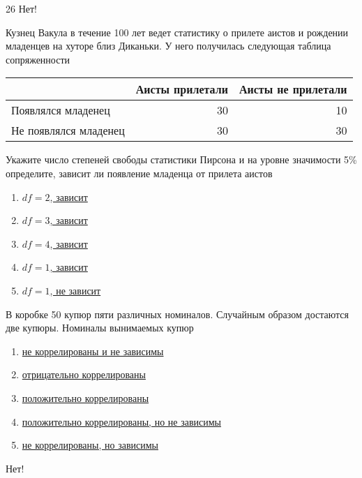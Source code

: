\documentclass[t]{beamer}
\begin{document}
 \begin{frame} \label{26-No} 
\begin{block}{26 \alert{Нет!} } 

   Кузнец Вакула в течение 100 лет ведет статистику о прилете аистов и рождении младенцев на хуторе близ Диканьки. У него получилась следующая таблица сопряженности

\begin{center}
\begin{tabular}{lrr} \toprule
& Аисты прилетали  & Аисты не прилетали \\
\midrule
Появлялся младенец & 30 & 10 \\
Не появлялся младенец & 30 & 30 \\
\bottomrule
\end{tabular}
\end{center}

Укажите число степеней свободы статистики Пирсона и на уровне значимости 5\% определите, зависит ли появление младенца от прилета аистов

  


 \end{block} 
\begin{enumerate} 
\item[] \hyperlink{26-No}{\beamergotobutton{} $df=2$, зависит}
\item[] \hyperlink{26-No}{\beamergotobutton{} $df=3$, зависит}
\item[] \hyperlink{26-No}{\beamergotobutton{} $df=4$, зависит}
\item[] \hyperlink{26-Yes}{\beamergotobutton{} $df=1$, зависит}
\item[] \hyperlink{26-No}{\beamergotobutton{} $df=1$, не зависит}
\end{enumerate} 

\end{frame} 


 \begin{frame} \label{27-No} 
\begin{block}{27} 

  В коробке 50 купюр пяти различных номиналов. Случайным образом достаются две купюры. Номиналы вынимаемых купюр
  


 \end{block} 
\begin{enumerate} 
\item[] \hyperlink{27-No}{\beamergotobutton{} не коррелированы и не зависимы}
\item[] \hyperlink{27-Yes}{\beamergotobutton{} отрицательно коррелированы}
\item[] \hyperlink{27-No}{\beamergotobutton{} положительно коррелированы}
\item[] \hyperlink{27-No}{\beamergotobutton{} положительно коррелированы, но не зависимы}
\item[] \hyperlink{27-No}{\beamergotobutton{} не коррелированы, но зависимы}
\end{enumerate} 

 \alert{Нет!} 
\end{frame} 
\end{document}
